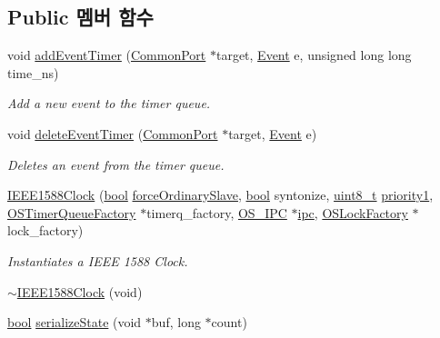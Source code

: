 \subsection*{Public 멤버 함수}
\begin{DoxyCompactItemize}
\item 
void \hyperlink{class_i_e_e_e1588_clock_a71199e4f44e22d308f9328255d80c896}{add\+Event\+Timer} (\hyperlink{class_common_port}{Common\+Port} $\ast$target, \hyperlink{class_event}{Event} e, unsigned long long time\+\_\+ns)
\begin{DoxyCompactList}\small\item\em Add a new event to the timer queue. \end{DoxyCompactList}\item 
void \hyperlink{class_i_e_e_e1588_clock_a19032512985731e4b13c15e47b95b548}{delete\+Event\+Timer} (\hyperlink{class_common_port}{Common\+Port} $\ast$target, \hyperlink{class_event}{Event} e)
\begin{DoxyCompactList}\small\item\em Deletes an event from the timer queue. \end{DoxyCompactList}\item 
\hyperlink{class_i_e_e_e1588_clock_a328d778afa9cc4f6a05eaa8b45bd120b}{I\+E\+E\+E1588\+Clock} (\hyperlink{avb__gptp_8h_af6a258d8f3ee5206d682d799316314b1}{bool} \hyperlink{class_i_e_e_e1588_clock_ae0c175aedaecf0e5d9b536e6f4f9dbab}{force\+Ordinary\+Slave}, \hyperlink{avb__gptp_8h_af6a258d8f3ee5206d682d799316314b1}{bool} syntonize, \hyperlink{stdint_8h_aba7bc1797add20fe3efdf37ced1182c5}{uint8\+\_\+t} \hyperlink{class_i_e_e_e1588_clock_aaaa084057ac150d5cfeaff1ccee422b8}{priority1}, \hyperlink{class_o_s_timer_queue_factory}{O\+S\+Timer\+Queue\+Factory} $\ast$timerq\+\_\+factory, \hyperlink{class_o_s___i_p_c}{O\+S\+\_\+\+I\+PC} $\ast$\hyperlink{class_i_e_e_e1588_clock_afe51478e6c657301658268066e29b31f}{ipc}, \hyperlink{class_o_s_lock_factory}{O\+S\+Lock\+Factory} $\ast$lock\+\_\+factory)
\begin{DoxyCompactList}\small\item\em Instantiates a I\+E\+EE 1588 Clock. \end{DoxyCompactList}\item 
\hyperlink{class_i_e_e_e1588_clock_a43656fbace88897b877269670a00fbe8}{$\sim$\+I\+E\+E\+E1588\+Clock} (void)
\item 
\hyperlink{avb__gptp_8h_af6a258d8f3ee5206d682d799316314b1}{bool} \hyperlink{class_i_e_e_e1588_clock_a7ae77a9c4cc2f66b95fe47a58b571113}{serialize\+State} (void $\ast$buf, long $\ast$count)

\end{DoxyCompactItemize}

